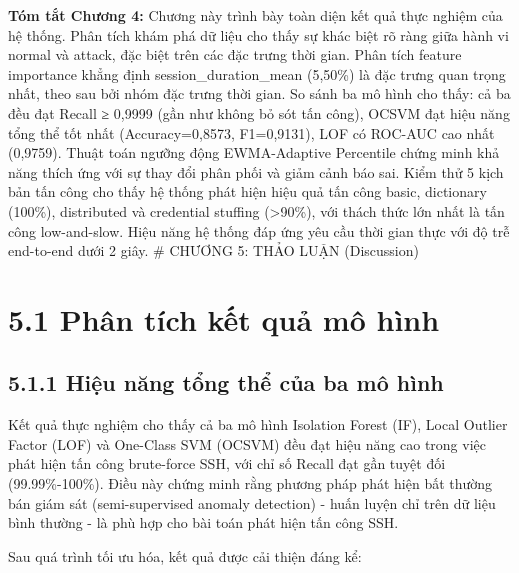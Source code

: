 \documentclass[
  a4paper]{report}
\begin{document}
\textbf{Tóm tắt Chương 4:} Chương này trình bày toàn diện kết quả thực
nghiệm của hệ thống. Phân tích khám phá dữ liệu cho thấy sự khác biệt rõ
ràng giữa hành vi normal và attack, đặc biệt trên các đặc trưng thời
gian. Phân tích feature importance khẳng định session\_duration\_mean
(5,50\%) là đặc trưng quan trọng nhất, theo sau bởi nhóm đặc trưng thời
gian. So sánh ba mô hình cho thấy: cả ba đều đạt Recall ≥ 0,9999 (gần
như không bỏ sót tấn công), OCSVM đạt hiệu năng tổng thể tốt nhất
(Accuracy=0,8573, F1=0,9131), LOF có ROC-AUC cao nhất (0,9759). Thuật
toán ngưỡng động EWMA-Adaptive Percentile chứng minh khả năng thích ứng
với sự thay đổi phân phối và giảm cảnh báo sai. Kiểm thử 5 kịch bản tấn
công cho thấy hệ thống phát hiện hiệu quả tấn công basic, dictionary
(100\%), distributed và credential stuffing (\textgreater90\%), với
thách thức lớn nhất là tấn công low-and-slow. Hiệu năng hệ thống đáp ứng
yêu cầu thời gian thực với độ trễ end-to-end dưới 2 giây. \# CHƯƠNG 5:
THẢO LUẬN (Discussion)

\section{5.1 Phân tích kết quả mô
hình}\label{phuxe2n-tuxedch-kux1ebft-quux1ea3-muxf4-huxecnh}

\subsection{5.1.1 Hiệu năng tổng thể của ba mô
hình}\label{hiux1ec7u-nux103ng-tux1ed5ng-thux1ec3-cux1ee7a-ba-muxf4-huxecnh}

Kết quả thực nghiệm cho thấy cả ba mô hình Isolation Forest (IF), Local
Outlier Factor (LOF) và One-Class SVM (OCSVM) đều đạt hiệu năng cao
trong việc phát hiện tấn công brute-force SSH, với chỉ số Recall đạt gần
tuyệt đối (99.99\%-100\%). Điều này chứng minh rằng phương pháp phát
hiện bất thường bán giám sát (semi-supervised anomaly detection) - huấn
luyện chỉ trên dữ liệu bình thường - là phù hợp cho bài toán phát hiện
tấn công SSH.

Sau quá trình tối ưu hóa, kết quả được cải thiện đáng kể:
\end{document}
